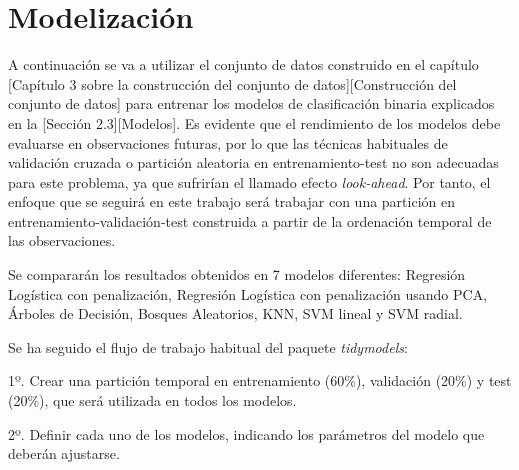 \documentclass[12pt,a4paper,]{book}
\title{}
\author{Nombre Completo Autor}
\date{18/11/2021}
\def\ifdoblecara{} %
\def\ifprincipal{} %
\let\ifprincipal\undefined %
\numberwithin{dummy}{section}
\theoremstyle{ocrenumbox}
\theoremstyle{blacknumex}
\theoremstyle{blacknumbox}
\theoremstyle{ocrenum}
\theoremstyle{ocrenum}
\begin{document}




\raggedbottom

\ifdefined\ifprincipal
\else
\setlength{\parindent}{1em}
\pagestyle{fancy}
\setcounter{tocdepth}{4}
\tableofcontents

\fi

\ifdefined\ifdoblecara
\fancyhead{}{}
\fancyhead[LE,RO]{\scriptsize\rightmark}
\fancyfoot[LO,RE]{\scriptsize\slshape \leftmark}
\fancyfoot[C]{}
\fancyfoot[LE,RO]{\footnotesize\thepage}
\else
\fancyhead{}{}
\fancyhead[RO]{\scriptsize\rightmark}
\fancyfoot[LO]{\scriptsize\slshape \leftmark}
\fancyfoot[C]{}
\fancyfoot[RO]{\footnotesize\thepage}
\fi

\renewcommand{\headrulewidth}{0.4pt}
\renewcommand{\footrulewidth}{0.4pt}

\hypertarget{modelizaciuxf3n}{%
\chapter{Modelización}\label{modelizaciuxf3n}}

A continuación se va a utilizar el conjunto de datos construido en el
capítulo {[}Capítulo 3 sobre la construcción del conjunto de
datos{]}{[}Construcción del conjunto de datos{]} para entrenar los
modelos de clasificación binaria explicados en la {[}Sección
2.3{]}{[}Modelos{]}. Es evidente que el rendimiento de los modelos debe
evaluarse en observaciones futuras, por lo que las técnicas habituales
de validación cruzada o partición aleatoria en entrenamiento-test no son
adecuadas para este problema, ya que sufrirían el llamado efecto
\emph{look-ahead}. Por tanto, el enfoque que se seguirá en este trabajo
será trabajar con una partición en entrenamiento-validación-test
construida a partir de la ordenación temporal de las observaciones.

Se compararán los resultados obtenidos en 7 modelos diferentes:
Regresión Logística con penalización, Regresión Logística con
penalización usando PCA, Árboles de Decisión, Bosques Aleatorios, KNN,
SVM lineal y SVM radial.

Se ha seguido el flujo de trabajo habitual del paquete
\emph{tidymodels}:

1º. Crear una partición temporal en entrenamiento (60\%), validación
(20\%) y test (20\%), que será utilizada en todos los modelos.

2º. Definir cada uno de los modelos, indicando los parámetros del modelo
que deberán ajustarse.
\end{document}
